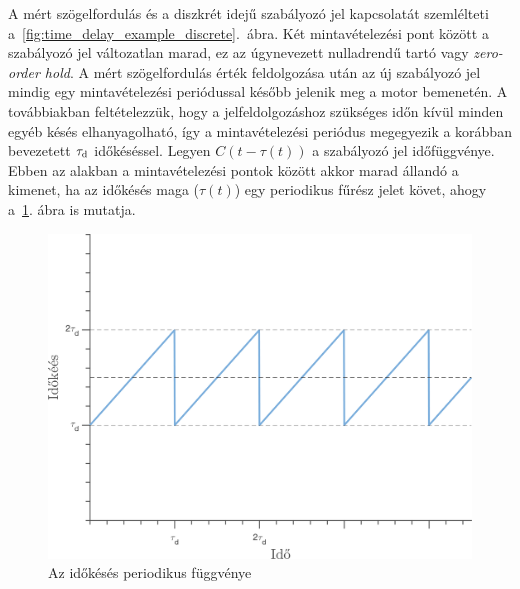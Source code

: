 A mért szögelfordulás és a diszkrét idejű szabályozó jel kapcsolatát szemlélteti a~\ref{fig:time_delay_example_discrete}.~ábra.
Két mintavételezési pont között a szabályozó jel változatlan marad, ez az úgynevezett nulladrendű tartó vagy \emph{zero-order hold}. A mért szögelfordulás érték 
feldolgozása után az új szabályozó jel mindig egy mintavételezési periódussal később jelenik meg a motor bemenetén.
A továbbiakban feltételezzük, hogy a jelfeldolgozáshoz szükséges időn kívül minden egyéb késés elhanyagolható, 
így a mintavételezési periódus megegyezik a korábban bevezetett \(\tau_{\mathrm{d}}\) időkéséssel. Legyen \(C(t-\tau(t))\) 
a szabályozó jel időfüggvénye. Ebben az alakban a mintavételezési pontok között akkor marad állandó a kimenet, ha 
az időkésés maga (\(\tau(t)\)) egy periodikus fűrész jelet követ, ahogy a~\ref{fig:time_delay_example_zoh}. ábra is mutatja.
\begin{figure}[H]
    \begin{center}
    \includegraphics[width=12cm]{images/delay_zoh_example_discrete.png}
    \caption{Az időkésés periodikus függvénye}\label{fig:time_delay_example_zoh}
    \end{center}
\end{figure}

